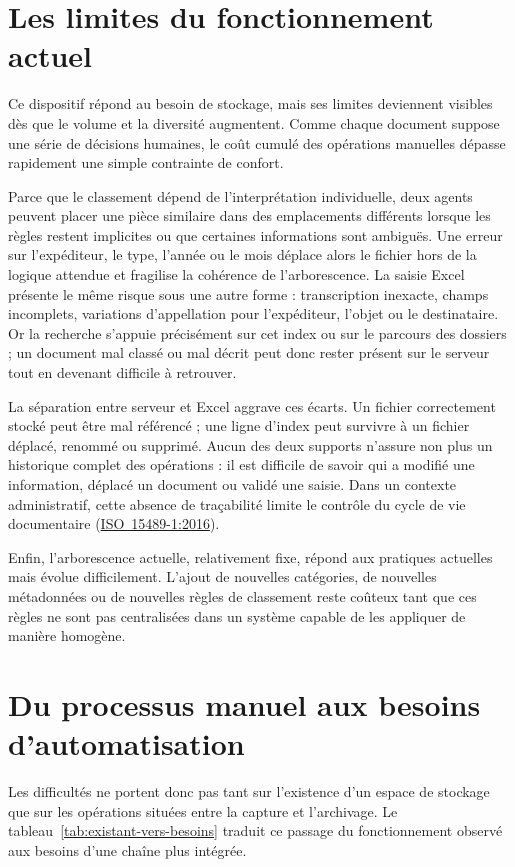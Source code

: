 \documentclass[12pt,a4paper]{report}
\newcommand{\citer}[2]{\hyperref[ref:#1]{#2}}
\begin{document}
\section{Les limites du fonctionnement actuel}
Ce dispositif répond au besoin de stockage, mais ses limites deviennent visibles dès que le volume et la diversité augmentent. Comme chaque document suppose une série de décisions humaines, le coût cumulé des opérations manuelles dépasse rapidement une simple contrainte de confort.

Parce que le classement dépend de l'interprétation individuelle, deux agents peuvent placer une pièce similaire dans des emplacements différents lorsque les règles restent implicites ou que certaines informations sont ambiguës. Une erreur sur l'expéditeur, le type, l'année ou le mois déplace alors le fichier hors de la logique attendue et fragilise la cohérence de l'arborescence. La saisie Excel présente le même risque sous une autre forme : transcription inexacte, champs incomplets, variations d'appellation pour l'expéditeur, l'objet ou le destinataire. Or la recherche s'appuie précisément sur cet index ou sur le parcours des dossiers ; un document mal classé ou mal décrit peut donc rester présent sur le serveur tout en devenant difficile à retrouver.

La séparation entre serveur et Excel aggrave ces écarts. Un fichier correctement stocké peut être mal référencé ; une ligne d'index peut survivre à un fichier déplacé, renommé ou supprimé. Aucun des deux supports n'assure non plus un historique complet des opérations : il est difficile de savoir qui a modifié une information, déplacé un document ou validé une saisie. Dans un contexte administratif, cette absence de traçabilité limite le contrôle du cycle de vie documentaire (\citer{iso15489}{\mbox{ISO 15489-1:2016}}).

Enfin, l'arborescence actuelle, relativement fixe, répond aux pratiques actuelles mais évolue difficilement. L'ajout de nouvelles catégories, de nouvelles métadonnées ou de nouvelles règles de classement reste coûteux tant que ces règles ne sont pas centralisées dans un système capable de les appliquer de manière homogène.

\section{Du processus manuel aux besoins d'automatisation}
Les difficultés ne portent donc pas tant sur l'existence d'un espace de stockage que sur les opérations situées entre la capture et l'archivage. Le tableau~\ref{tab:existant-vers-besoins} traduit ce passage du fonctionnement observé aux besoins d'une chaîne plus intégrée.
\end{document}
